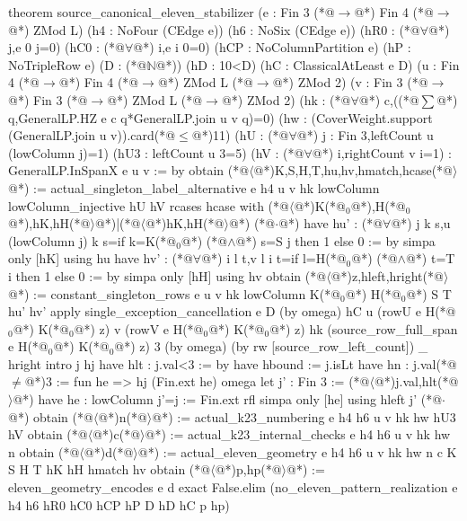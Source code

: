 theorem source_canonical_eleven_stabilizer
    (e : Fin 3 (*@$\to$@*) Fin 4 (*@$\to$@*) ZMod L)
    (h4 : NoFour (CEdge e)) (h6 : NoSix (CEdge e))
    (hR0 : (*@$\forall$@*) j,e 0 j=0) (hC0 : (*@$\forall$@*) i,e i 0=0)
    (hCP : NoColumnPartition e) (hP : NoTripleRow e)
    (D : (*@$\mathbb N$@*)) (hD : 10<D) (hC : ClassicalAtLeast e D)
    (u : Fin 4 (*@$\to$@*) Fin 4 (*@$\to$@*) ZMod L (*@$\to$@*) ZMod 2)
    (v : Fin 3 (*@$\to$@*) Fin 3 (*@$\to$@*) ZMod L (*@$\to$@*) ZMod 2)
    (hk : (*@$\forall$@*) c,((*@$\sum$@*) q,GeneralLP.HZ e c q*GeneralLP.join u v q)=0)
    (hw : (CoverWeight.support (GeneralLP.join u v)).card(*@$\le$@*)11)
    (hU : (*@$\forall$@*) j : Fin 3,leftCount u (lowColumn j)=1)
    (hU3 : leftCount u 3=5) (hV : (*@$\forall$@*) i,rightCount v i=1) :
    GeneralLP.InSpanX e u v := by
  obtain (*@$\langle$@*)K,S,H,T,hu,hv,hmatch,hcase(*@$\rangle$@*) := actual_singleton_label_alternative e h4 u v hk
    lowColumn lowColumn_injective hU hV
  rcases hcase with (*@$\langle$@*)K(*@${}_0$@*),H(*@${}_0$@*),hK,hH(*@$\rangle$@*)|(*@$\langle$@*)hK,hH(*@$\rangle$@*)
  (*@$\cdot$@*) have hu' : (*@$\forall$@*) j k s,u (lowColumn j) k s=if k=K(*@${}_0$@*) (*@$\land$@*) s=S j then 1 else 0 := by
      simpa only [hK] using hu
    have hv' : (*@$\forall$@*) i l t,v l i t=if l=H(*@${}_0$@*) (*@$\land$@*) t=T i then 1 else 0 := by
      simpa only [hH] using hv
    obtain (*@$\langle$@*)z,hleft,hright(*@$\rangle$@*) := constant_singleton_rows e u v hk lowColumn K(*@${}_0$@*) H(*@${}_0$@*) S T hu' hv'
    apply single_exception_cancellation e D (by omega) hC u (rowU e H(*@${}_0$@*) K(*@${}_0$@*) z)
      v (rowV e H(*@${}_0$@*) K(*@${}_0$@*) z) hk (source_row_full_span e H(*@${}_0$@*) K(*@${}_0$@*) z) 3 (by omega)
      (by rw [source_row_left_count]) _ hright
    intro j hj
    have hlt : j.val<3 := by
      have hbound := j.isLt
      have hn : j.val(*@$\ne$@*)3 := fun he => hj (Fin.ext he)
      omega
    let j' : Fin 3 := (*@$\langle$@*)j.val,hlt(*@$\rangle$@*)
    have he : lowColumn j'=j := Fin.ext rfl
    simpa only [he] using hleft j'
  (*@$\cdot$@*) obtain (*@$\langle$@*)n(*@$\rangle$@*) := actual_k23_numbering e h4 h6 u v hk hw hU3 hV
    obtain (*@$\langle$@*)c(*@$\rangle$@*) := actual_k23_internal_checks e h4 h6 u v hk hw n
    obtain (*@$\langle$@*)d(*@$\rangle$@*) := actual_eleven_geometry e h4 h6 u v hk hw n c K S H T hK hH hmatch hv
    obtain (*@$\langle$@*)p,hp(*@$\rangle$@*) := eleven_geometry_encodes e d
    exact False.elim (no_eleven_pattern_realization e h4 h6 hR0 hC0 hCP hP D hD hC p hp)
